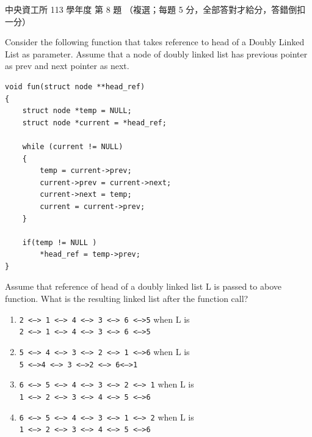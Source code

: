\begin{pastexam}[label={px:ncu-113-dsa-08}]{中央資工所 113 學年度 第 8 題}
（複選；每題 5 分，全部答對才給分，答錯倒扣一分）

Consider the following function that takes reference to head of a Doubly Linked List as parameter. Assume
that a node of doubly linked list has previous pointer as prev and next pointer as next.
\begin{verbatim}
void fun(struct node **head_ref)
{
    struct node *temp = NULL;
    struct node *current = *head_ref;

    while (current != NULL)
    {
        temp = current->prev;
        current->prev = current->next;
        current->next = temp;
        current = current->prev;
    }

    if(temp != NULL )
        *head_ref = temp->prev;
}
\end{verbatim}
Assume that reference of head of a doubly linked list L is passed to above function. What is the resulting
linked list after the function call?
\begin{enumerate}[label=(\Alph*)]
\item \texttt{2 <--> 1 <--> 4 <--> 3 <--> 6 <-->5} when L is\\
\texttt{2 <--> 1 <--> 4 <--> 3 <--> 6 <-->5}
\item \texttt{5 <--> 4 <--> 3 <--> 2 <--> 1 <-->6} when L is\\
\texttt{5 <-->4 <--> 3 <-->2 <--> 6<-->1}
\item \texttt{6 <--> 5 <--> 4 <--> 3 <--> 2 <--> 1} when L is\\
\texttt{1 <--> 2 <--> 3 <--> 4 <--> 5 <-->6}
\item \texttt{6 <--> 5 <--> 4 <--> 3 <--> 1 <--> 2} when L is\\
\texttt{1 <--> 2 <--> 3 <--> 4 <--> 5 <-->6}
\end{enumerate}
\end{pastexam}

